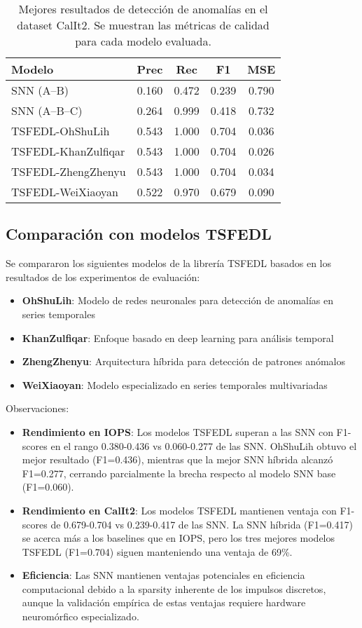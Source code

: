 \begin{table}[htbp]
\centering
\small
\begin{tabular}{lcccc}
\hline\hline
\textbf{Modelo} & \textbf{Prec} & \textbf{Rec} & \textbf{F1} & \textbf{MSE} \\
\hline
SNN (A--B) & 0.160 & 0.472 & 0.239 & 0.790 \\
SNN (A--B--C) & 0.264 & 0.999 & 0.418 & 0.732 \\
TSFEDL-OhShuLih & 0.543 & 1.000 & 0.704 & 0.036 \\
TSFEDL-KhanZulfiqar & 0.543 & 1.000 & 0.704 & 0.026 \\
TSFEDL-ZhengZhenyu & 0.543 & 1.000 & 0.704 & 0.034 \\
TSFEDL-WeiXiaoyan & 0.522 & 0.970 & 0.679 & 0.090 \\
\hline\hline
\end{tabular}
\caption{Mejores resultados de detección de anomalías en el dataset CalIt2. Se muestran las métricas de calidad para cada modelo evaluada.}
\label{tab:resultados-iops}
\end{table}

\subsection{Comparación con modelos TSFEDL}
Se compararon los siguientes modelos de la librería TSFEDL basados en los resultados de los experimentos de evaluación:
\begin{itemize}
    \item \textbf{OhShuLih}: Modelo de redes neuronales para detección de anomalías en series temporales
    \item \textbf{KhanZulfiqar}: Enfoque basado en deep learning para análisis temporal
    \item \textbf{ZhengZhenyu}: Arquitectura híbrida para detección de patrones anómalos
    \item \textbf{WeiXiaoyan}: Modelo especializado en series temporales multivariadas
\end{itemize}
Observaciones:
\begin{itemize}
    \item \textbf{Rendimiento en IOPS}: Los modelos TSFEDL superan a las SNN con F1-scores en el rango 0.380-0.436 vs 0.060-0.277 de las SNN. OhShuLih obtuvo el mejor resultado (F1=0.436), mientras que la mejor SNN híbrida alcanzó F1=0.277, cerrando parcialmente la brecha respecto al modelo SNN base (F1=0.060).
    \item \textbf{Rendimiento en CalIt2}: Los modelos TSFEDL mantienen ventaja con F1-scores de 0.679-0.704 vs 0.239-0.417 de las SNN. La SNN híbrida (F1=0.417) se acerca más a los baselines que en IOPS, pero los tres mejores modelos TSFEDL (F1=0.704) siguen manteniendo una ventaja de 69\%.
    \item \textbf{Eficiencia}: Las SNN mantienen ventajas potenciales en eficiencia computacional debido a la sparsity inherente de los impulsos discretos, aunque la validación empírica de estas ventajas requiere hardware neuromórfico especializado.
\end{itemize}
